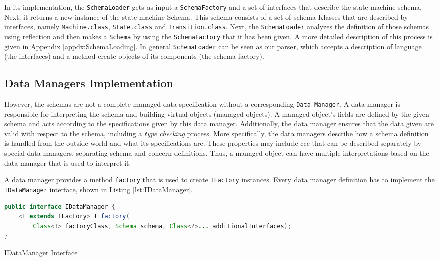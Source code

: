 In its implementation, the \texttt{SchemaLoader} gets as input a \texttt{SchemaFactory} and a set of interfaces that describe the state machine schema.
Next, it returns a new instance of the state machine Schema.
This schema consists of a set of schema Klasses that are described by interfaces, namely \texttt{Machine.class}, \texttt{State.class} and \texttt{Transition.class}.
Next, the \texttt{SchemaLoader} analyzes the definition of those schemas using reflection and then makes a \texttt{Schema} by using the \texttt{SchemaFactory} that it has been given.
A more detailed description of this process is given in Appendix \ref{appdx:SchemaLoading}.
In general \texttt{SchemaLoader} can be seen as our parser, which accepts a description of language (the interfaces) and a method create objects of its components (the schema factory).

\subsection{Data Managers Implementation}\label{Data Managers Implementation}
However, the schemas are not a complete managed data specification without a corresponding \texttt{Data Manager}.
A data manager is responsible for interpreting the schema and building virtual objects (managed objects). 
A managed object's fields are defined by the given schema and acts according to the specifications given by this data manager.
Additionally, the data manager ensures that the data given are valid with respect to the schema, including a \textit{type checking} process.
More specifically, the data managers describe how a schema definition is handled from the outside world and what its specifications are.
These properties may include \ac{ccc} that can be described separately by special data managers, separating schema and concern definitions.
Thus, a managed object can have multiple interpretations based on the data manager that is used to interpret it.

A data manager provides a method \texttt{factory} that is used to create \texttt{IFactory} instances.
Every data manager definition has to implement the \texttt{IDataManager} interface, shown in Listing \ref{lst:IDataManager}.

\begin{sourcecode} [H]
	\begin{lstlisting}[language=Java, escapechar=|]
public interface IDataManager {
	<T extends IFactory> T factory(
		Class<T> factoryClass, Schema schema, Class<?>... additionalInterfaces);
}
	\end{lstlisting}
	\caption{IDataManager Interface}
	\label{lst:IDataManager}
\end{sourcecode}

